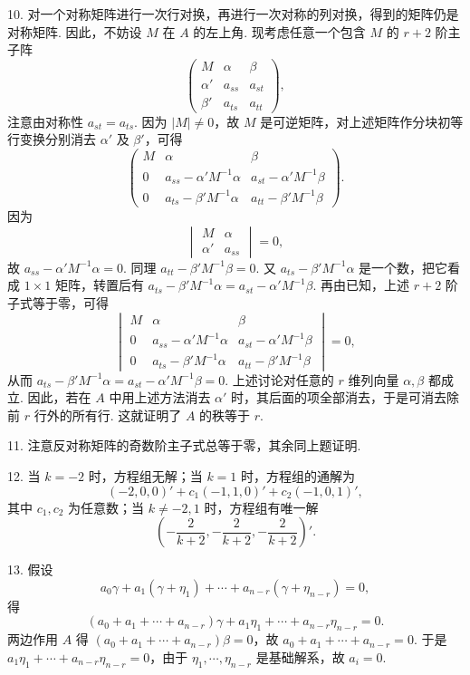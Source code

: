 \documentclass[UTF8,12pt,a4paper,fontset=fandol]{ctexart}
\begin{document}
10. 对一个对称矩阵进行一次行对换，再进行一次对称的列对换，得到的矩阵仍是对称矩阵. 因此，不妨设 $M$ 在 $A$ 的左上角. 现考虑任意一个包含 $M$ 的 $r+2$ 阶主子阵
\[
\begin{pmatrix}
M&\alpha&\beta\\
\alpha'&a_{ss}&a_{st}\\
\beta'&a_{ts}&a_{tt}
\end{pmatrix},
\]
注意由对称性 $a_{st}=a_{ts}$. 因为 $|M|\ne 0$，故 $M$ 是可逆矩阵，对上述矩阵作分块初等行变换分别消去 $\alpha'$ 及 $\beta'$，可得
\[
\begin{pmatrix}
M&\alpha&\beta\\
0&a_{ss}-\alpha'M^{-1}\alpha&a_{st}-\alpha'M^{-1}\beta\\
0&a_{ts}-\beta'M^{-1}\alpha&a_{tt}-\beta'M^{-1}\beta
\end{pmatrix}.
\]
因为
\[
\begin{vmatrix}
M&\alpha\\
\alpha'&a_{ss}
\end{vmatrix}=0,
\]
故 $a_{ss}-\alpha'M^{-1}\alpha=0$. 同理 $a_{tt}-\beta'M^{-1}\beta=0$. 又 $a_{ts}-\beta'M^{-1}\alpha$ 是一个数，把它看成 $1\times 1$ 矩阵，转置后有 $a_{ts}-\beta'M^{-1}\alpha=a_{st}-\alpha'M^{-1}\beta$. 再由已知，上述 $r+2$ 阶子式等于零，可得
\[
\begin{vmatrix}
M&\alpha&\beta\\
0&a_{ss}-\alpha'M^{-1}\alpha&a_{st}-\alpha'M^{-1}\beta\\
0&a_{ts}-\beta'M^{-1}\alpha&a_{tt}-\beta'M^{-1}\beta
\end{vmatrix}=0,
\]
从而 $a_{ts}-\beta'M^{-1}\alpha=a_{st}-\alpha'M^{-1}\beta=0$. 上述讨论对任意的 $r$ 维列向量 $\alpha,\beta$ 都成立. 因此，若在 $A$ 中用上述方法消去 $\alpha'$ 时，其后面的项全部消去，于是可消去除前 $r$ 行外的所有行. 这就证明了 $A$ 的秩等于 $r$.

11. 注意反对称矩阵的奇数阶主子式总等于零，其余同上题证明.

12. 当 $k=-2$ 时，方程组无解；当 $k=1$ 时，方程组的通解为
\[
(-2,0,0)'+c_1(-1,1,0)'+c_2(-1,0,1)',
\]
其中 $c_1,c_2$ 为任意数；当 $k\ne -2,1$ 时，方程组有唯一解
\[
\left(-\frac{2}{k+2},-\frac{2}{k+2},-\frac{2}{k+2}\right)'.
\]

13. 假设
\[
a_0\gamma+a_1(\gamma+\eta_1)+\cdots+a_{n-r}(\gamma+\eta_{n-r})=0,
\]
得
\[
(a_0+a_1+\cdots+a_{n-r})\gamma+a_1\eta_1+\cdots+a_{n-r}\eta_{n-r}=0.
\]
两边作用 $A$ 得 $(a_0+a_1+\cdots+a_{n-r})\beta=0$，故 $a_0+a_1+\cdots+a_{n-r}=0$. 于是 $a_1\eta_1+\cdots+a_{n-r}\eta_{n-r}=0$，由于 $\eta_1,\cdots,\eta_{n-r}$ 是基础解系，故 $a_i=0$.
\end{document}
